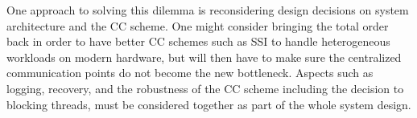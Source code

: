 \documentclass[preprint]{sig-alternate-nocprt}
\begin{document}
One approach to solving this dilemma is reconsidering design decisions on system architecture and the CC scheme. One might consider bringing the total order back in order to have better CC schemes such as SSI to handle heterogeneous workloads on modern hardware, but will then have to make sure the centralized communication points do not become the new bottleneck. Aspects such as logging, recovery, and the robustness of the CC scheme including the decision to blocking threads, must be considered together as part of the whole system design.



\end{document}
